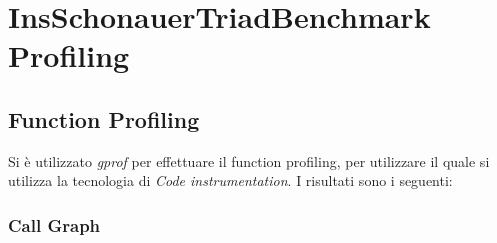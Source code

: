 
\chapter{InsSchonauerTriadBenchmark Profiling}
\label{cap:profiling}

\section{Function Profiling}

Si è utilizzato \emph{gprof} per effettuare il function profiling, per utilizzare il quale si utilizza la tecnologia di \textit{Code instrumentation}. I risultati sono i seguenti:

\subsection{Call Graph}

